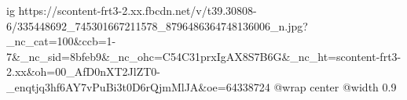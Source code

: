  
 
 
 
 

\ifcmt
  ig https://scontent-frt3-2.xx.fbcdn.net/v/t39.30808-6/335448692_745301667211578_8796486364748136006_n.jpg?_nc_cat=100&ccb=1-7&_nc_sid=8bfeb9&_nc_ohc=C54C31prxIgAX8S7B6G&_nc_ht=scontent-frt3-2.xx&oh=00_AfD0nXT2JlZT0-_enqtjq3hf6AY7vPuBi3t0D6rQjmMlJA&oe=64338724
  @wrap center
  @width 0.9
\fi

